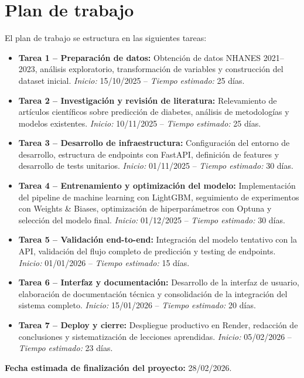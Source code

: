 \documentclass[12pt, a4paper]{report}
\begin{document}
\chapter{Plan de trabajo}


El plan de trabajo se estructura en las siguientes tareas:

\begin{itemize}
    \item \textbf{Tarea 1 -- Preparación de datos:}
    Obtención de datos NHANES 2021--2023, análisis exploratorio, transformación de variables y construcción del dataset inicial.
    \textit{Inicio:} 15/10/2025 -- \textit{Tiempo estimado:} 25 días.

    \item \textbf{Tarea 2 -- Investigación y revisión de literatura:}
    Relevamiento de artículos científicos sobre predicción de diabetes, análisis de metodologías y modelos existentes.
    \textit{Inicio:} 10/11/2025 -- \textit{Tiempo estimado:} 25 días.

    \item \textbf{Tarea 3 -- Desarrollo de infraestructura:}
    Configuración del entorno de desarrollo, estructura de endpoints con FastAPI, definición de features y desarrollo de tests unitarios.
    \textit{Inicio:} 01/11/2025 -- \textit{Tiempo estimado:} 30 días.

    \item \textbf{Tarea 4 -- Entrenamiento y optimización del modelo:}
    Implementación del pipeline de machine learning con LightGBM, seguimiento de experimentos con Weights \& Biases, optimización de hiperparámetros con Optuna y selección del modelo final.
    \textit{Inicio:} 01/12/2025 -- \textit{Tiempo estimado:} 30 días.

    \item \textbf{Tarea 5 -- Validación end-to-end:}
    Integración del modelo tentativo con la API, validación del flujo completo de predicción y testing de endpoints.
    \textit{Inicio:} 01/01/2026 -- \textit{Tiempo estimado:} 15 días.

    \item \textbf{Tarea 6 -- Interfaz y documentación:}
    Desarrollo de la interfaz de usuario, elaboración de documentación técnica y consolidación de la integración del sistema completo.
    \textit{Inicio:} 15/01/2026 -- \textit{Tiempo estimado:} 20 días.

    \item \textbf{Tarea 7 -- Deploy y cierre:}
    Despliegue productivo en Render, redacción de conclusiones y sistematización de lecciones aprendidas.
    \textit{Inicio:} 05/02/2026 -- \textit{Tiempo estimado:} 23 días.
\end{itemize}

\textbf{Fecha estimada de finalización del proyecto:} 28/02/2026.



\end{document}
